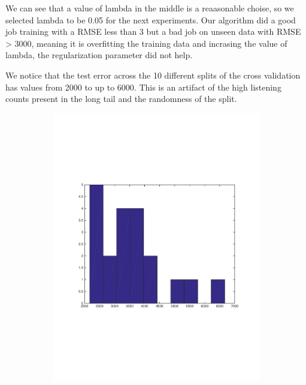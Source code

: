 We can see that a value of lambda in the middle is a reaasonable choise, so we selected lambda to be 0.05 for the next experiments.
Our algorithm did a good job training  with a RMSE less than  3 but a bad job on unseen data with RMSE > 3000, meaning it is overfitting 
the training data and incrasing the value of lambda, the regularization parameter did not help.


We notice that the test error across the 10 different splits of the cross validation has values from 2000 to up to 6000. This is an artifact of the high listening counts present in the long tail and the randomness of the split.
\begin{figure}[h]
  \centering
  \begin{subfigure}[b]{0.45\textwidth}
   \includegraphics[width=\textwidth]{figures/distributionRMSE.pdf}
    \caption{}
  \end{subfigure}
  \begin{subfigure}[b]{0.45\textwidth}

\end{subfigure}
\end{figure}
